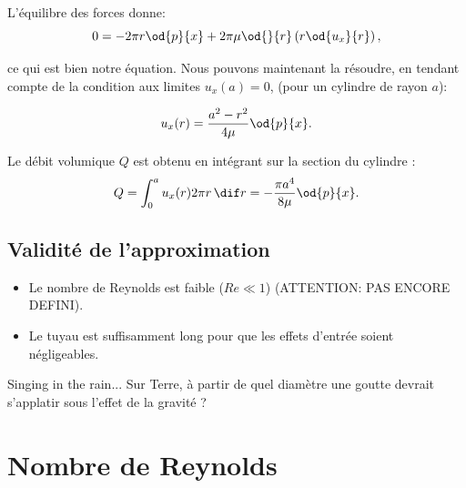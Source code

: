 L'équilibre des forces donne:
\begin{displaymath}
0 = -2\pi r \od{p}{x} + 2\pi \mu \od{}{r}\left( r \od{u_x}{r}\right), 
\end{displaymath}

ce qui est bien notre équation. Nous pouvons maintenant la résoudre, en tendant compte de la condition aux limites $u_x(a) = 0$, (pour un cylindre de rayon $a$):

\begin{displaymath}
u_x(r) = \frac{a^2 - r^2}{4\mu} \od{p}{x}.
\end{displaymath}

Le débit volumique $Q$ est obtenu en intégrant sur la section du cylindre :
\begin{displaymath}
Q = \int_0^a u_x(r) 2\pi r \, \dif r = -\frac{\pi a^4}{8\mu} \od{p}{x}.
\end{displaymath}

\subsection{Validité de l'approximation}


 \begin{itemize}
     \item Le nombre de Reynolds est faible ($Re \ll 1$) (ATTENTION: PAS ENCORE DEFINI).
     \item Le tuyau est suffisamment long pour que les effets d'entrée soient négligeables.
 \end{itemize}
%

\begin{studentinvestigation}{Singing in the rain...}
  Sur Terre, à partir de quel diamètre une goutte devrait s'applatir sous l'effet de la gravité ? 
\end{studentinvestigation}


\section{Nombre de Reynolds}

